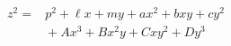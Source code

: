 \begin{proposition}\label{eq:103}
\[
    \begin{aligned}z^2={}&p^2+\ell x+my+ax^2+bxy+cy^2\\&{}+Ax^3+Bx^2y+Cxy^2+Dy^3\end{aligned}
\]
\end{proposition}
